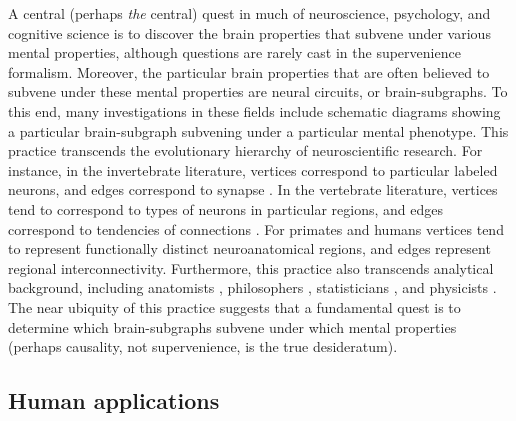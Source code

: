 \documentclass{article}
\newcommand{\mB}{\mathcal{B}}
\newcommand{\mM}{\mathcal{M}}
\newcommand{\PP}{\mathbb{P}}           %
\newcommand{\MeB}{\mM \overset{\varepsilon}{{\sim}}_{\PP} \mB}
\begin{document}
A central (perhaps \emph{the} central) quest in much of neuroscience, psychology, and cognitive science is to discover the brain properties that subvene under various mental properties, although questions are rarely cast in the supervenience formalism.  Moreover, the particular brain properties that are often believed to subvene under these mental properties are neural circuits, or brain-subgraphs.  To this end, many investigations in these fields include schematic diagrams showing a particular brain-subgraph subvening under a particular mental phenotype. This practice transcends the evolutionary hierarchy of neuroscientific research.  For instance, in the invertebrate literature, vertices correspond to particular labeled neurons, and edges correspond to synapse \cite{NorthGreenspan07}.  In the vertebrate literature, vertices tend to correspond to types of neurons in particular regions, and edges correspond to tendencies of connections \cite{Shepherd04}.  For primates \cite{Felleman_VanEssen91} and humans \cite{Mori05} vertices tend to represent functionally distinct neuroanatomical regions, and edges represent regional interconnectivity. Furthermore, this practice also transcends analytical background, including anatomists \cite{Abeles91}, philosophers \cite{Koch_Davis94}, statisticians \cite{Rao_Lewicki02}, and physicists \cite{Chow_Dalibard03}.  The near ubiquity of this practice suggests that a fundamental quest is to determine which brain-subgraphs subvene under which mental properties (perhaps causality, not supervenience, is the true desideratum).  



% 
% 

\subsection{Human applications} %
\label{par:human_applications}
\end{document}

